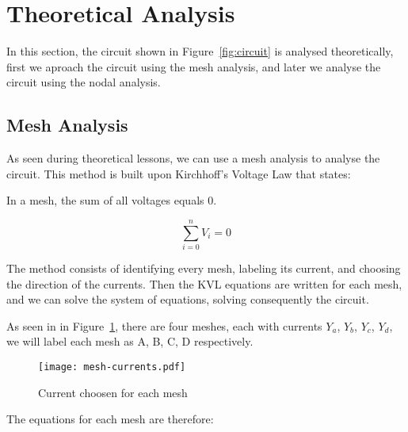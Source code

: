 \section{Theoretical Analysis}
\label{sec:analysis}

In this section, the circuit shown in Figure~\ref{fig:circuit} is analysed
theoretically, first we aproach the circuit using the mesh analysis, and later we analyse the circuit using the nodal analysis.

\subsection{Mesh Analysis}

As seen during theoretical lessons, we can use a mesh analysis to analyse the circuit.
This method is built upon Kirchhoff's Voltage Law that states:

In a mesh, the sum of all voltages equals 0.

\begin{equation}
  \sum_{i=0}^{n} V_i = 0
  \label{eq:kvl}
\end{equation}

The method consists of identifying every mesh, labeling its current, and choosing the direction of the currents.
Then the KVL equations are written for each mesh, and we can solve the system of equations, solving consequently the circuit.

As seen in in Figure~\ref{fig:mesh}, there are four meshes, each with currents $Y_a$, $Y_b$, $Y_c$, $Y_d$, 
we will label each mesh as A, B, C, D respectively.

\begin{figure}[H] \centering
  \texttt{[image: mesh-currents.pdf]}
  \caption{Current choosen for each mesh}
  \label{fig:mesh}
\end{figure}

The equations for each mesh are therefore:


